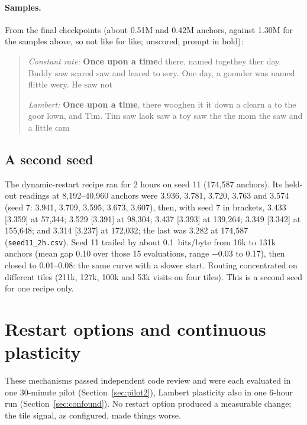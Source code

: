 \documentclass[10pt]{article}
\newcommand{\bpb}{bits/byte}
\newcommand{\code}[1]{\texttt{#1}}
\begin{document}
\paragraph{Samples.} From the final checkpoints (about 0.51M and 0.42M anchors, against 1.30M for
the samples above, so not like for like; unscored; prompt in bold):
\begin{quote}\small
\emph{Constant rate:} \textbf{Once upon a time}d there, named togethey ther day. Buddy saw scared saw
and leared to sery. One day, a goonder was named flittle wery. He saw not

\emph{Lambert:} \textbf{Once upon a time}, there wooghen it it down a clearn a to the goor lown, and
Tim. Tim saw laok saw a toy saw the the mom the saw and a little cam
\end{quote}

\subsection{A second seed}
\label{sec:seed}

The dynamic-restart recipe ran for 2 hours on seed 11 (174,587 anchors). Its held-out readings at
8,192--40,960 anchors were 3.936, 3.781, 3.720, 3.763 and 3.574 (seed 7: 3.941, 3.709, 3.595, 3.673,
3.607), then, with seed 7 in brackets, 3.433 [3.359] at 57,344; 3.529 [3.391] at 98,304; 3.437
[3.393] at 139,264; 3.349 [3.342] at 155,648; and 3.314 [3.237] at 172,032; the last was 3.282 at
174,587 (\code{seed11\_2h.csv}). Seed 11 trailed by about 0.1~\bpb{} from 16k to 131k anchors (mean
gap 0.10 over those 15 evaluations, range $-0.03$ to 0.17), then closed to 0.01--0.08: the same
curve with a slower start. Routing concentrated on different tiles (211k, 127k, 100k and 53k visits on
four tiles). This is a second seed for one recipe only.

\section{Restart options and continuous plasticity}
\label{sec:options}

These mechanisms passed independent code review and were each evaluated in one 30-minute pilot
(Section~\ref{sec:pilot2}), Lambert plasticity also in one 6-hour run (Section~\ref{sec:confound}).
No restart option produced a measurable change; the tile signal, as configured, made things worse.
\end{document}
